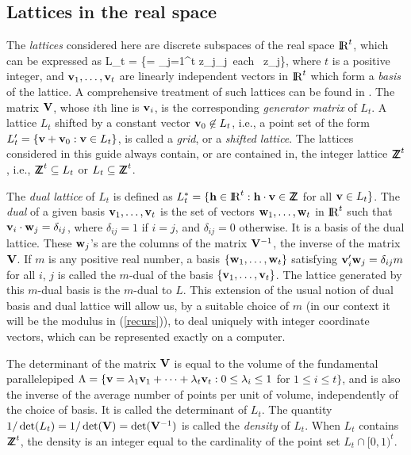 \subsection {Lattices in the real space}

The {\em lattices\/} considered here are discrete subspaces of the 
real space ${\rm I\kern-0.2em R}^t$, which can be expressed as 
\eq
 L_t = \left\{\bv = \sum_{j=1}^t z_j\bv_j\mid \mbox{ each } z_j\in\Z\right\},
                                                       \label {eq:lattice}
\endeq
where $t$ is a positive integer, and
${\bf v}_1,\dots,{\bf v}_t$ are linearly independent vectors in ${\rm I\kern-0.2em R}^t$
which form a {\em basis\/} of the lattice.
A comprehensive treatment of such lattices can be found in \cite{mCON99a}.
The matrix ${\bf V}$, whose $i$th line is ${\bf v}_i$, is the
corresponding {\em generator matrix\/} of $L_t$.
A lattice $L_t$ shifted by a constant vector ${\bf v}_0\not\in L_t$,
i.e., a point set of the form $L'_t = \{{\bf v}+{\bf v}_0 : {\bf v} \in L_t\}$,
is called a {\em grid\/}, or a {\em shifted lattice\/}.
The lattices considered in this guide always contain, or are contained in,
the integer lattice ${\sf Z\kern-0.4em Z}^t$, i.e., ${\sf Z\kern-0.4em Z}^t\subseteq L_t$ or $L_t\subseteq {\sf Z\kern-0.4em Z}^t$.

The {\em dual lattice} of $L_t$ is defined as
$L_t^* = \{{\bf h} \in {\rm I\kern-0.2em R}^t : {\bf h}\cdot{\bf v} \in{\sf Z\kern-0.4em Z}$ for all ${\bf v}\in L_t\}$.
The {\em dual\/} of a given basis ${\bf v}_1,\dots,{\bf v}_t$ is the set of
vectors ${\bf w}_1,\dots,{\bf w}_t$ in ${\rm I\kern-0.2em R}^t$
such that ${\bf v}_i\cdot{\bf w}_j = \delta_{ij}$, where $\delta_{ij}=1$
if $i=j$, and $\delta_{ij}=0$ otherwise.
It is a basis of the dual lattice.
These ${\bf w}_j$'s are the columns of the matrix ${\bf V}^{-1}$,
the inverse of the matrix ${\bf V}$.
If $m$ is any positive real number, a basis $\{{\bf w}_1,\dots,{\bf w}_t\}$
satisfying ${\bf v}'_i {\bf w}_j = \delta_{ij} m$ for all $i$, $j$ is called
the $m$-dual of the basis $\{{\bf v}_1,\dots,{\bf v}_t\}$. 
The lattice generated by this $m$-dual basis is the $m$-dual to $L$. 
This extension of the usual notion of dual basis and dual lattice
will allow us, by a suitable choice of $m$ (in our context it will be 
the modulus in (\ref{recurs})), to deal uniquely with integer coordinate 
vectors,  which can be represented exactly on a computer.

The determinant of the matrix ${\bf V}$ is equal to the volume of the
fundamental parallelepiped
$\Lambda = \{{\bf v} = \lambda_1{\bf v}_1 + \cdots + \lambda_t{\bf v}_t :
0\le \lambda_i\le 1$ for $1\le i\le t\}$, and is also the inverse
of the average number of points per unit of volume, independently of 
the choice of basis. It is called the determinant of $L_t$.
The quantity $1/\det(L_t) = 1/\det({\bf V}) = \det({\bf V}^{-1})$
is called the {\em density\/} of $L_t$.
When $L_t$ contains ${\sf Z\kern-0.4em Z}^t$, the density is an integer equal to the 
cardinality of the point set $L_t \cap [0,1)^t$.


